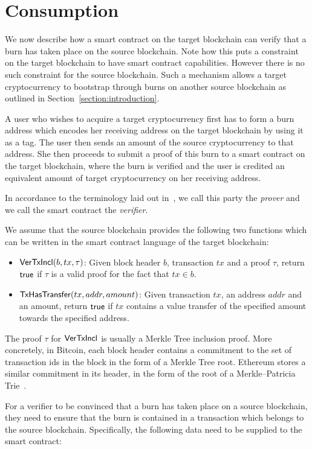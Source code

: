 \section{Consumption}

We now describe how a smart contract on the target blockchain can verify that a burn has taken place on the source blockchain. Note how this puts a constraint on the target blockchain to have smart contract capabilities. However there is no such constraint for the source blockchain. Such a mechanism allows a target cryptocurrency to bootstrap through burns on another source blockchain as outlined in Section~\ref{section:introduction}.

A user who wishes to acquire a target cryptocurrency first has to form a burn address which encodes her receiving address on the target blockchain by using it as a tag. The user then sends an amount of the source cryptocurrency to that address. She then proceeds to submit a proof of this burn to a smart contract on the target blockchain, where the burn is verified and the user is credited an equivalent amount of target cryptocurrency on her receiving address.

In accordance to the terminology laid out in~\cite{pow-sidechains}, we call this party the \emph{prover} and we call the smart contract the \emph{verifier}.

We assume that the source blockchain provides the following two functions which can be written in the smart contract language of the target blockchain:

\begin{itemize}
  \item $\mathsf{VerTxIncl}(b, tx, \tau)$: Given block header $b$, transaction $tx$ and a proof $\tau$, return $\mathsf{true}$ if $\tau$ is a valid proof for the fact that $tx \in b$.
  \item $\mathsf{TxHasTransfer}(tx, addr, amount)$: Given transaction $tx$, an address $addr$ and an amount, return $\mathsf{true}$ if $tx$ contains a value transfer of the specified amount towards the specified address.
\end{itemize}

The proof $\tau$ for $\mathsf{VerTxIncl}$ is usually a Merkle Tree inclusion proof. More concretely, in Bitcoin, each block header contains a commitment to the set of transaction ids in the block in the form of a Merkle Tree root. Ethereum stores a similar commitment in its header, in the form of the root of a Merkle--Patricia Trie~\cite{wood2014ethereum}.

For a verifier to be convinced that a burn has taken place on a source blockchain, they need to ensure that the burn is contained in a transaction which belongs to the source blockchain. Specifically, the following data need to be supplied to the smart contract:

